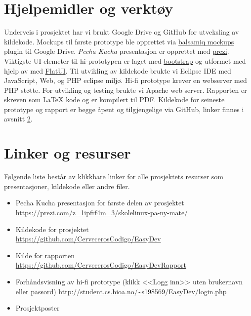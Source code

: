 \section{Hjelpemidler og verktøy} \label{sec:hjelpogverkt}
Underveis i prosjektet har vi brukt Google Drive og GitHub for utveksling av kildekode. Mockups til første prototype ble opprettet via \href{https://balsamiq.com/}{balsamiq mockups} plugin til Google Drive. \textit{Pecha Kucha} presentasjon er opprettet med \href{https://prezi.com/z_1ipfrf4m_3/skolelinux-pa-ny-mate/}{prezi}. Viktigste UI elemeter til hi-prototypen er laget med \href{http://getbootstrap.com/}{bootstrap} og utformet med hjelp av med \href{http://designmodo.github.io/Flat-UI/}{FlatUI}. Til utvikling av kildekode brukte vi Eclipse IDE med JavaScript, Web, og PHP eclipse miljø. Hi-fi prototype krever en webserver med PHP støtte. For utvikling og testing brukte vi Apache web server.
Rapporten er skreven som \LaTeX{} kode og er kompilert til PDF.
Kildekode for seineste prototype og rapport er begge åpent og tilgjengelige via GitHub, linker finnes i avsnitt \ref{sec:linker}.

\section{Linker og resurser} \label{sec:linker}
Følgende liste består av klikkbare linker for alle prosjektets resurser som presentasjoner, kildekode eller andre filer. 
\begin{itemize}
\item Pecha Kucha presentasjon for første delen av prosjektet\\ \url{https://prezi.com/z_1ipfrf4m_3/skolelinux-pa-ny-mate/}
\item Kildekode for prosjektet\\
\url{https://github.com/CervecerosCodigo/EasyDev}
\item Kilde for rapporten\\
\url{https://github.com/CervecerosCodigo/EasyDevRapport}
\item Forhåndsvisning av hi-fi prototype (klikk <<Logg inn>> uten brukernavn eller passord)
\url{http://student.cs.hioa.no/~s198569/EasyDev/login.php}
\item Prosjektposter
\end{itemize}